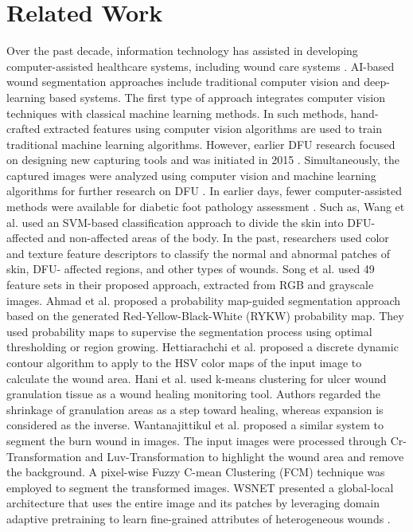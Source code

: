 \documentclass[review]{elsarticle}
\begin{document}
\section{Related Work}
\label{Related Work}
Over the past decade, information technology has assisted in developing computer-assisted healthcare systems, including wound care systems \cite{cassidy2021dfuc}. AI-based wound segmentation approaches include traditional computer vision and deep-learning based systems. The first type of approach integrates computer vision techniques with classical machine learning methods. In such methods, hand-crafted extracted features using computer vision algorithms are used to train traditional machine learning algorithms. However, earlier DFU research focused on designing new capturing tools and was initiated in 2015 \cite{yap2016computer}. Simultaneously, the captured images were analyzed using computer vision and machine learning algorithms for further research on DFU \cite{yap2018new, aldoulah2025swishres}.
\newline\indent In earlier days, fewer computer-assisted methods were available for diabetic foot pathology assessment \cite{yap2018new,liu2015automatic}. Such as, Wang et al. \cite{wang2016area} used an SVM-based classification approach to divide the skin into DFU-affected and non-affected areas of the body. In the past, researchers used color and texture feature descriptors to classify the normal and abnormal patches of skin, DFU- affected regions, and other types of wounds. Song et al. \cite{armstrong1998validation} used 49 feature sets in their proposed approach, extracted from RGB and grayscale images. Ahmad et al. \cite{ahmad2018anxiety} proposed a probability map-guided segmentation approach based on the generated Red-Yellow-Black-White (RYKW) probability map. They used probability maps to supervise the segmentation process using optimal thresholding or region growing. Hettiarachchi et al. \cite{song2012automated} proposed a discrete dynamic contour algorithm to apply to the HSV color maps of the input image to calculate the wound area. Hani et al. \cite{hani2012haemoglobin} used k-means clustering for ulcer wound granulation tissue as a wound healing monitoring tool. Authors regarded the shrinkage of granulation areas as a step toward healing, whereas expansion is considered as the inverse. Wantanajittikul et al. \cite{wantanajittikul2012automatic} proposed a similar system to segment the burn wound in images. The input images were processed through Cr-Transformation and Luv-Transformation to highlight the wound area and remove the background. A pixel-wise Fuzzy C-mean Clustering (FCM) technique was employed to segment the transformed images. WSNET presented a global-local architecture that uses the entire image and its patches by leveraging domain adaptive pretraining to learn fine-grained attributes of heterogeneous wounds \cite{oota2023wsnet}.
\end{document}
